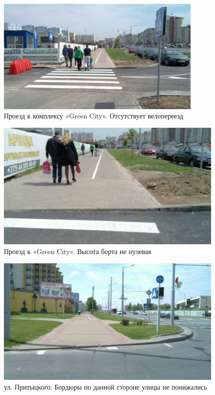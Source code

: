 \documentclass[a4paper,14pt,twoside]{extarticle}
\begin{document}
\begin{figure}[hb!]
        \centering
        \includegraphics[width=0.9\textwidth]{Pictures/1000000000000A00000005A0BEC879E2.jpg}
        \caption{Проезд к комплексу «Green City». Отсутствует велопереезд}
\end{figure}

\begin{figure}[h!]
        \centering
        \includegraphics[width=\textwidth]{Pictures/1000000000000A00000005A062A3E4CA.jpg}
        \caption{Проезд к «Green City». Высота борта не нулевая}
\end{figure}

\begin{figure}[h!]
        \centering
        \includegraphics[width=\textwidth]{Pictures/1000000000000A00000005A028520F90.jpg}
        \caption{ул. Притыцкого. Бордюры по данной стороне улицы не понижались}
\end{figure}
\end{document}
